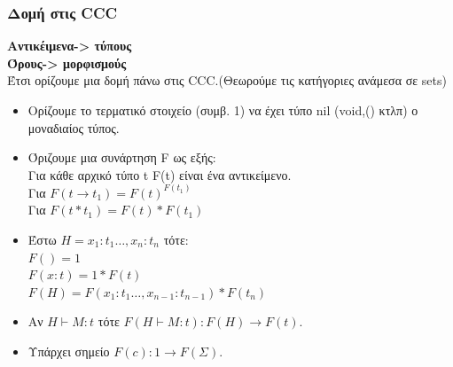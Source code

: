 \documentclass[hyperref={pdfpagelabels=false}]{beamer}
\begin{document}
\begin{frame}
	\frametitle{Δομή στις CCC}
\textbf{Αντικέιμενα-> τύπους \\
Όρους-> μορφισμούς} \\
Έτσι ορίζουμε μια δομή πάνω στις CCC.(Θεωρούμε τις κατήγοριες ανάμεσα σε sets)
  \begin{itemize}
  \item {
 Ορίζουμε το τερματικό στοιχείο (συμβ. 1) να έχει τύπο nil (void,() κτλπ) ο μοναδιαίος τύπος.
    \pause %
  }
  \item {   
    Όριζουμε μια συνάρτηση F ως εξής:
            \\    Για κάθε αρχικό τύπο t F(t) είναι ένα αντικείμενο.
              \\  Για $F(t\rightarrow t_1) = F(t)^{F(t_1)} $
               \\ Για $F(t*t_1) = F(t)*F(t_1) $
  }
  \item<3-> {Έστω $H= x_1 :t_1 \dots ,x_n:t_n$ τότε:
                \\$F()=1$\\
                $F(x:t)=1*F(t)$
               \\ $F(H)=F(x_1:t_1 \dots,x_{n-1}:t_{n-1})*F(t_n)$

  }
  \end{itemize}
  \end{frame}
  \begin{frame}
	  \begin{itemize}
  \item {
    Αν $H \vdash M:t$ τότε $F(H \vdash M:t): F(H) \rightarrow F(t)$.
  }

  \item<2-> {
   Υπάρχει σημείο $F(c):1 \rightarrow F(\Sigma)$.   
  }
  \end{itemize}
\end{frame}
\end{document}
